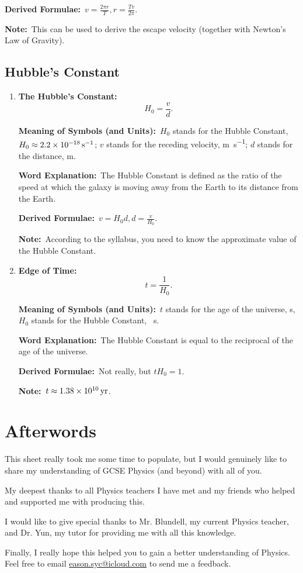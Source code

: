 \documentclass[8pt]{article}
\newcommand{\MeanSymb}{\textbf{Meaning of Symbols (and Units):}\ }
\newcommand{\WordExpl}{\textbf{Word Explanation:}\ }
\newcommand{\DeriForm}{\textbf{Derived Formulae:}\ }
\newcommand{\Note}{\textbf{Note:}\ }
\begin{document}
            \DeriForm \(v = \frac{2\pi r}{T}, r = \frac{Tv}{2\pi}\).

            \Note This can be used to derive the escape velocity (together with Newton's Law of Gravity).

        \subsection{Hubble's Constant}
            \begin{enumerate}
                \item \textbf{The Hubble's Constant:}
                \[
                    H_0 = \frac{v}{d}.
                \]

                \MeanSymb \(H_0\) stands for the Hubble Constant, \(H_0 \approx \qty{2.2 e -18}{\per \second}\); \(v\) stands for the receding velocity, \unit{\metre\per\second}; \(d\) stands for the distance, \unit{\metre}.

                \WordExpl The Hubble Constant is defined as the  ratio of the speed at which the galaxy is moving away from the Earth to its distance from the Earth.

                \DeriForm \(v = H_0 d, d = \frac{v}{H_0}\).

                \Note According to the syllabus, you need to know the approximate value of the Hubble Constant.

                \item \textbf{Edge of Time:}
                \[
                    t = \frac{1}{H_0}.
                \]

                \MeanSymb \(t\) stands for the age of the universe, \unit{\second}, \(H_0\) stands for the Hubble Constant, \unit{\per\second}.

                \WordExpl The Hubble Constant is equal to the reciprocal of the age of the universe.

                \DeriForm Not really, but \(t H_0 = 1\).

                \Note \(t \approx \qty{1.38 e 10}{\mathrm{yr}}\).
            \end{enumerate}

    \section*{Afterwords}
        This sheet really took me some time to populate, but I would genuinely like to share my understanding of GCSE Physics (and beyond) with all of you.
        
        My deepest thanks to all Physics teachers I have met and my friends who helped and supported me with producing this.
        
        I would like to give special thanks to Mr. Blundell, my current Physics teacher, and Dr. Yun, my tutor for providing me with all this knowledge.

        Finally, I really hope this helped you to gain a better understanding of Physics. Feel free to email \href{eason.syc@icloud.com}{eason.syc@icloud.com} to send me a feedback.
\end{document}
